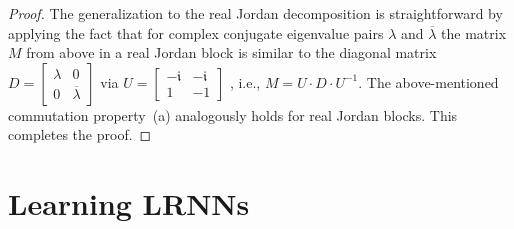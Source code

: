 \documentclass[twoside,11pt]{article}
\theoremstyle{definition}
\begin{document}
\begin{proof}
The generalization to the real Jordan decomposition is straightforward by
applying the fact that for complex conjugate eigenvalue pairs $\lambda$ and
$\overline{\lambda}$ the matrix $M$ from above in a real Jordan block is
similar to the diagonal matrix $D = \left[ \begin{array}{cc}
	\lambda & 0\\
	0 & \overline{\lambda}
\end{array} \right]$ via $U = \left[ \begin{array}{cc}
	-\mathfrak{i} & -\mathfrak{i}\\
	1 & -1
\end{array} \right]$ \citep[Sect.~3.4.1]{HJ13}, i.e., $M = U \cdot D \cdot
U^{-1}$. The above-mentioned commutation property~(a) analogously holds for real
Jordan blocks. This completes the proof.
\end{proof}

\section{Learning LRNNs}\label{learn}
\end{document}
